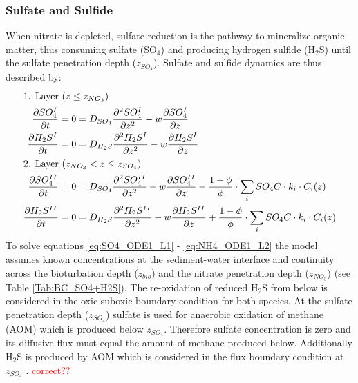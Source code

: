 \documentclass[gmd, manuscript]{copernicus}
\begin{document}
\subsubsection{Sulfate and Sulfide}
When nitrate is depleted, sulfate reduction is the pathway to mineralize organic matter, thus consuming sulfate (SO$_4$) and producing hydrogen sulfide (H$_2$S) until the sulfate penetration depth ($z_{SO_4}$). 
Sulfate and sulfide dynamics are thus described by:
\begin{align}
\intertext{1. Layer ($z \leq z_{NO_3}$)}
 \frac{\partial SO_4^I}{\partial t} &= 0 = D_{SO_4} \frac{\partial^2SO_4^I }{\partial z^2} - w\frac{\partial SO_4^I }{\partial z} \label{eq:SO4_ODE1_L1}\\ %
 \frac{\partial H_2S^I}{\partial t} &= 0 = D_{H_2S} \frac{\partial^2H_2S^I }{\partial z^2} - w\frac{\partial H_2S^I }{\partial z}\label{eq:H2S_ODE1_L1}\\
 \intertext{2. Layer ($z_{NO_3} < z \leq z_{SO_4}$)} 
\frac{\partial SO_4^{II}}{\partial t} &= 0 = D_{SO_4} \frac{\partial^2SO_4^{II} }{\partial z^2} - w\frac{\partial SO_4^{II} }{\partial z} - \frac{1-\phi}{\phi} \cdot \sum_i SO_4C \cdot k_i \cdot C_{i}(z) \label{eq:NO3_ODE1_L2}\\
\frac{\partial H_2S^{II}}{\partial t} &= 0 = D_{H_2S} \frac{\partial^2H_2S^{II} }{\partial z^2} - w\frac{\partial H_2S^{II} }{\partial z} + \frac{1-\phi}{\phi} \cdot \sum_i SO_4C  \cdot k_i \cdot C_{i}(z)\label{eq:NH4_ODE1_L2}
\end{align}
To solve equations \ref{eq:SO4_ODE1_L1} - \ref{eq:NH4_ODE1_L2} the model assumes known concentrations at the sediment-water interface and continuity 
across the bioturbation depth ($z_{bio}$) and the nitrate penetration depth ($z_{NO_3}$) (see Table \ref{Tab:BC_SO4+H2S}). The re-oxidation of reduced H$_2$S from below is considered in the oxic-suboxic boundary condition 
for both species. At the sulfate penetration depth ($z_{SO_4}$) sulfate is used for anaerobic oxidation of methane (AOM) which is produced below $z_{SO_4}$. Therefore sulfate concentration is zero and its diffusive flux must equal 
the amount of methane produced below. Additionally H$_2$S is produced by AOM which is considered in the flux boundary condition at $z_{SO_4}$ . \textcolor{red}{correct??}\\
\end{document}
